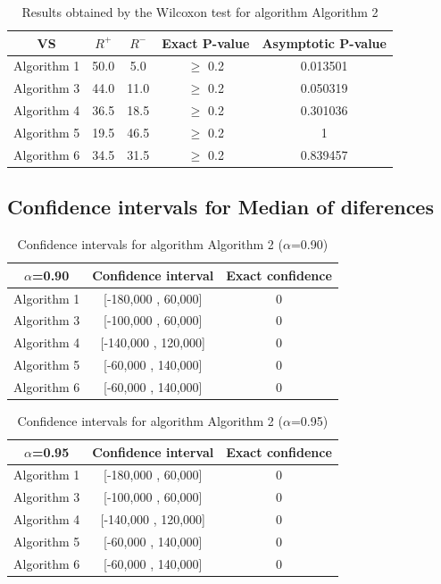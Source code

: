 \documentclass[a4paper,10pt]{article}
\begin{document}
\begin{table}[!htp]
\centering\small
\begin{tabular}{
|c|c|c|c|c|}
\hline
 VS & $R^{+}$ & $R^{-}$ & Exact P-value & Asymptotic P-value \\ \hline 
Algorithm 1 & 50.0 & 5.0 & $\geq$ 0.2 & 0.013501\\ \hline 
Algorithm 3 & 44.0 & 11.0 & $\geq$ 0.2 & 0.050319\\ \hline 
Algorithm 4 & 36.5 & 18.5 & $\geq$ 0.2 & 0.301036\\ \hline 
Algorithm 5 & 19.5 & 46.5 & $\geq$ 0.2 & 1\\ \hline 
Algorithm 6 & 34.5 & 31.5 & $\geq$ 0.2 & 0.839457\\ \hline 

\end{tabular}
\caption{Results obtained by the Wilcoxon test for algorithm Algorithm 2}
\end{table}

\subsection{Confidence intervals for Median of diferences}

\begin{table}[!htp]
\centering\small
\begin{tabular}{
|c|c|c|}
\hline
 $\alpha$=0.90 & Confidence interval & Exact confidence \\ \hline 
Algorithm 1 & [-180,000 , 60,000] & 0\\ \hline 
Algorithm 3 & [-100,000 , 60,000] & 0\\ \hline 
Algorithm 4 & [-140,000 , 120,000] & 0\\ \hline 
Algorithm 5 & [-60,000 , 140,000] & 0\\ \hline 
Algorithm 6 & [-60,000 , 140,000] & 0\\ \hline 

\end{tabular}
\caption{Confidence intervals for algorithm Algorithm 2 ($\alpha$=0.90)}
\end{table}
\begin{table}[!htp]
\centering\small
\begin{tabular}{
|c|c|c|}
\hline
 $\alpha$=0.95 & Confidence interval & Exact confidence \\ \hline 
Algorithm 1 & [-180,000 , 60,000] & 0\\ \hline 
Algorithm 3 & [-100,000 , 60,000] & 0\\ \hline 
Algorithm 4 & [-140,000 , 120,000] & 0\\ \hline 
Algorithm 5 & [-60,000 , 140,000] & 0\\ \hline 
Algorithm 6 & [-60,000 , 140,000] & 0\\ \hline 

\end{tabular}
\caption{Confidence intervals for algorithm Algorithm 2 ($\alpha$=0.95)}
\end{table}
\end{document}

